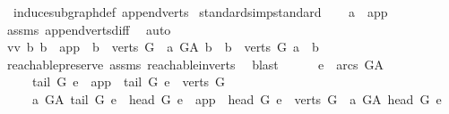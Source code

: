 \begin{isabellebody}
\ \ induce{\isacharunderscore}{\kern0pt}subgraph{\isacharunderscore}{\kern0pt}def\ append{\isacharunderscore}{\kern0pt}verts\ \isanewline
{}\isamarkupfalse%
{\isacharparenleft}{\kern0pt}standard{\isacharcomma}{\kern0pt}simp{\isacharcomma}{\kern0pt}standard{\isacharparenright}{\kern0pt}\isanewline
\ \ \isamarkupfalse%
\ {\isachardoublequoteopen}a\ {\isasymnoteq}\ app{\isachardoublequoteclose}\ \isamarkupfalse%
\ assms{\isacharparenleft}{\kern0pt}{}{\isacharparenright}{\kern0pt}\ append{\isacharunderscore}{\kern0pt}verts{\isacharunderscore}{\kern0pt}diff\ \isamarkupfalse%
\ auto\isanewline
\ \ \isamarkupfalse%
\ \isamarkupfalse%
\ vv{\isacharcolon}{\kern0pt}\ {\isachardoublequoteopen}{\isacharbraceleft}{\kern0pt}b{\isachardot}{\kern0pt}\ {\isacharparenleft}{\kern0pt}b\ {\isacharequal}{\kern0pt}\ app\ {\isasymor}\ b\ {\isasymin}\ verts\ G{\isacharparenright}{\kern0pt}\ {\isasymand}\ a\ {\isasymrightarrow}\isactrlsup {\isacharplus}{\kern0pt}\isactrlbsub G{\isacharunderscore}{\kern0pt}A\isactrlesub \ b{\isacharbraceright}{\kern0pt}\ {\isacharequal}{\kern0pt}\ {\isacharbraceleft}{\kern0pt}b\ {\isasymin}\ verts\ G{\isachardot}{\kern0pt}\ a\ {\isasymrightarrow}\isactrlsup {\isacharplus}{\kern0pt}\ b{\isacharbraceright}{\kern0pt}{\isachardoublequoteclose}\ \isanewline
\ \ \ \ \isamarkupfalse%
\ reachable{}{\isacharunderscore}{\kern0pt}preserve\ assms\ reachable{}{\isacharunderscore}{\kern0pt}in{\isacharunderscore}{\kern0pt}verts{\isacharparenleft}{\kern0pt}{}{\isacharparenright}{\kern0pt}\ \isamarkupfalse%
\ blast\ \ \isanewline
\ \ \isamarkupfalse%
\ {\isachardoublequoteopen}{\isacharbraceleft}{\kern0pt}e\ {\isasymin}\ arcs\ G{\isacharunderscore}{\kern0pt}A{\isachardot}{\kern0pt}\isanewline
\ \ \ \ \ {\isacharparenleft}{\kern0pt}tail\ G\ e\ {\isacharequal}{\kern0pt}\ app\ {\isasymor}\ tail\ G\ e\ {\isasymin}\ verts\ G{\isacharparenright}{\kern0pt}\ {\isasymand}\isanewline
\ \ \ \ \ a\ {\isasymrightarrow}\isactrlsup {\isacharplus}{\kern0pt}\isactrlbsub G{\isacharunderscore}{\kern0pt}A\isactrlesub \ tail\ G\ e\ {\isasymand}\ {\isacharparenleft}{\kern0pt}head\ G\ e\ {\isacharequal}{\kern0pt}\ app\ {\isasymor}\ head\ G\ e\ {\isasymin}\ verts\ G{\isacharparenright}{\kern0pt}\ {\isasymand}\ a\ {\isasymrightarrow}\isactrlsup {\isacharplus}{\kern0pt}\isactrlbsub G{\isacharunderscore}{\kern0pt}A\isactrlesub \ head\ G\ e{\isacharbraceright}{\kern0pt}\ {\isacharequal}{\kern0pt}\isanewline

\end{isabellebody}
